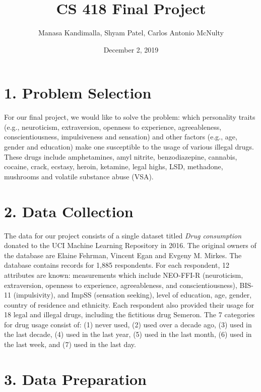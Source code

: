\documentclass[10pt]{article}
\title{CS 418 Final Project}
\date{December 2, 2019}
\author {Manasa Kandimalla, Shyam Patel, Carlos Antonio McNulty}
\begin{document}
\maketitle

\section*{1. Problem Selection}

For our final project, we would like to solve the problem: which personality traits (e.g., neuroticism, extraversion, openness to experience, agreeableness, conscientiousness, impulsiveness and sensation) and other factors (e.g., age, gender and education) make one susceptible to the usage of various illegal drugs. These drugs include amphetamines, amyl nitrite, benzodiazepine, cannabis, cocaine, crack, ecstasy, heroin, ketamine, legal highs, LSD, methadone, mushrooms and volatile substance abuse (VSA).


\section*{2. Data Collection}

The data for our project consists of a single dataset titled \textit{Drug consumption} donated to the UCI Machine Learning Repository in 2016. The original owners of the database are Elaine Fehrman, Vincent Egan and Evgeny M. Mirkes. The database contains records for 1,885 respondents. For each respondent, 12 attributes are known: measurements which include NEO-FFI-R (neuroticism, extraversion, openness to experience, agreeableness, and conscientiousness), BIS-11 (impulsivity), and ImpSS (sensation seeking), level of education, age, gender, country of residence and ethnicity. Each respondent also provided their usage for 18 legal and illegal drugs, including the fictitious drug Semeron. The 7 categories for drug usage consist of: (1) never used, (2) used over a decade ago, (3) used in the last decade, (4) used in the last year, (5) used in the last month, (6) used in the last week, and (7) used in the last day.

\section*{3. Data Preparation}
\end{document}
